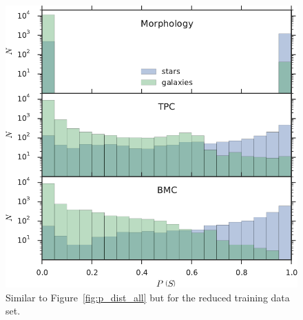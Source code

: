 \documentclass[useAMS,usenatbib]{mn2e}
\begin{document}
\begin{figure}
    \centering
  \includegraphics[width=\columnwidth]{figures/p_dist_cut.pdf}
  \caption{Similar to Figure~\ref{fig:p_dist_all}
           but for the reduced training data set.}
  \label{fig:p_dist_cut}
\end{figure}


%
\end{document}

